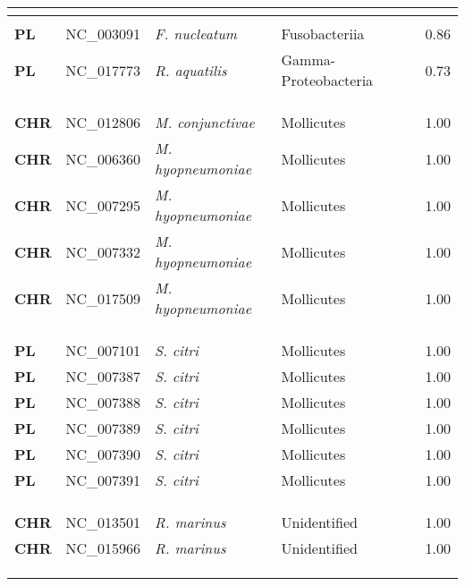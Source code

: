 \begin{adjustwidth}{-3cm}{2cm}
{\begin{supertabular}{>{\bfseries}l|p{0.1\textwidth}p{0.14\textwidth}l|l}
\\
\hline\\
PL & NC\_003091 & \textit{F. nucleatum} & Fusobacteriia & 0.86\\
PL & NC\_017773 & \textit{R. aquatilis} & Gamma-Proteobacteria & 0.73\\
\\
\\
\hline\\
CHR & NC\_012806 & \textit{M. conjunctivae} & Mollicutes & 1.00\\
CHR & NC\_006360 & \textit{M. hyopneumoniae} & Mollicutes & 1.00\\
CHR & NC\_007295 & \textit{M. hyopneumoniae} & Mollicutes & 1.00\\
CHR & NC\_007332 & \textit{M. hyopneumoniae} & Mollicutes & 1.00\\
CHR & NC\_017509 & \textit{M. hyopneumoniae} & Mollicutes & 1.00\\
\\
\\
\hline\\
PL & NC\_007101 & \textit{S. citri} & Mollicutes & 1.00\\
PL & NC\_007387 & \textit{S. citri} & Mollicutes & 1.00\\
PL & NC\_007388 & \textit{S. citri} & Mollicutes & 1.00\\
PL & NC\_007389 & \textit{S. citri} & Mollicutes & 1.00\\
PL & NC\_007390 & \textit{S. citri} & Mollicutes & 1.00\\
PL & NC\_007391 & \textit{S. citri} & Mollicutes & 1.00\\
\\
\\
\hline\\
CHR & NC\_013501 & \textit{R. marinus} & Unidentified & 1.00\\
CHR & NC\_015966 & \textit{R. marinus} & Unidentified & 1.00\\
\\
\\
\hline\\

\end{supertabular}}
\end{adjustwidth}
